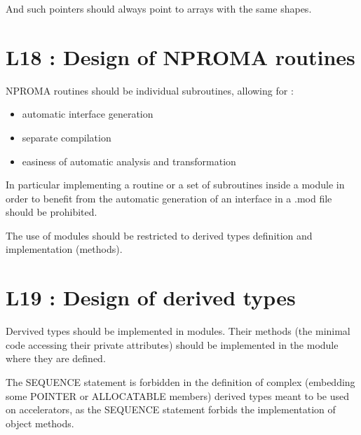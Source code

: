 \documentclass[letterpaper,10pt,english]{sphinxmanual}
\begin{document}
\begin{sphinxVerbatim}[commandchars=\\\{\}]
   
  
   
  
 
\end{sphinxVerbatim}

And such pointers should always point to arrays with the same shapes.


\section{L18 : Design of NPROMA routines}
\label{\detokenize{rules/L18:l18-design-of-nproma-routines}}\label{\detokenize{rules/L18::doc}}
NPROMA routines should be individual subroutines, allowing for :
\begin{itemize}
\item {} 
automatic interface generation

\item {} 
separate compilation

\item {} 
easiness of automatic analysis and transformation

\end{itemize}

In particular implementing a routine or a set of subroutines inside a module in
order to benefit from the automatic generation of an interface in a .mod file
should be prohibited.

The use of modules should be restricted to derived types definition and implementation (methods).


\section{L19 : Design of derived types}
\label{\detokenize{rules/L19:l19-design-of-derived-types}}\label{\detokenize{rules/L19::doc}}
Dervived types should be implemented in modules. Their methods (the minimal code accessing their private attributes)
should be implemented in the module where they are defined.

The SEQUENCE statement is forbidden in the definition of complex (embedding some POINTER or ALLOCATABLE members) derived types
meant to be used on accelerators, as the SEQUENCE statement
forbids the implementation of object methods.
\end{document}
